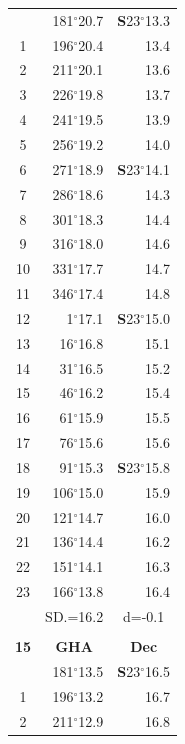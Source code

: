 \documentclass[10pt, a4paper]{report}
\begin{document}
\begin{scriptsize}
\begin{tabular*}{0.2\textwidth}[t]{@{\extracolsep{\fill}}|c|rr|}
\hline\rule{0pt}{2.6ex}\noindent
0 & 181$^\circ$20.7 & \textbf{S}23$^\circ$13.3\\
1 & 196$^\circ$20.4 & 13.4\\
2 & 211$^\circ$20.1 & 13.6\\
3 & 226$^\circ$19.8 & \raisebox{0.24ex}{\boldmath$\cdot$~\boldmath$\cdot$~~}13.7\\
4 & 241$^\circ$19.5 & 13.9\\
5 & 256$^\circ$19.2 & 14.0\\[2Pt]
6 & 271$^\circ$18.9 & \textbf{S}23$^\circ$14.1\\
7 & 286$^\circ$18.6 & 14.3\\
8 & 301$^\circ$18.3 & 14.4\\
9 & 316$^\circ$18.0 & \raisebox{0.24ex}{\boldmath$\cdot$~\boldmath$\cdot$~~}14.6\\
10 & 331$^\circ$17.7 & 14.7\\
11 & 346$^\circ$17.4 & 14.8\\[2Pt]
12 & 1$^\circ$17.1 & \textbf{S}23$^\circ$15.0\\
13 & 16$^\circ$16.8 & 15.1\\
14 & 31$^\circ$16.5 & 15.2\\
15 & 46$^\circ$16.2 & \raisebox{0.24ex}{\boldmath$\cdot$~\boldmath$\cdot$~~}15.4\\
16 & 61$^\circ$15.9 & 15.5\\
17 & 76$^\circ$15.6 & 15.6\\[2Pt]
18 & 91$^\circ$15.3 & \textbf{S}23$^\circ$15.8\\
19 & 106$^\circ$15.0 & 15.9\\
20 & 121$^\circ$14.7 & 16.0\\
21 & 136$^\circ$14.4 & \raisebox{0.24ex}{\boldmath$\cdot$~\boldmath$\cdot$~~}16.2\\
22 & 151$^\circ$14.1 & 16.3\\
23 & 166$^\circ$13.8 & 16.4\\
\hline
\rule{0pt}{2.4ex} & \multicolumn{1}{c}{SD.=16.2} & \multicolumn{1}{c|}{d=-0.1}\\
\hline
\multicolumn{1}{c}{}\\[-0.5ex]\hline
\multicolumn{1}{|c|}{\rule{0pt}{2.6ex}\textbf{15}} & \multicolumn{1}{c}{\textbf{GHA}} & \multicolumn{1}{c|}{\textbf{Dec}}\\
\hline\rule{0pt}{2.6ex}\noindent
0 & 181$^\circ$13.5 & \textbf{S}23$^\circ$16.5\\
1 & 196$^\circ$13.2 & 16.7\\
2 & 211$^\circ$12.9 & 16.8\\

\end{tabular*}
\end{scriptsize}
\end{document}
